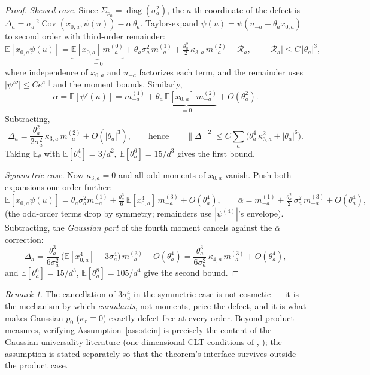 \documentclass[11pt]{article}
\theoremstyle{remark}
\newtheorem{remark}{Remark}
\newcommand{\E}{\mathbb{E}}
\newcommand{\Cov}{\operatorname{Cov}}
\newcommand{\diag}{\operatorname{diag}}
\newcommand{\Sig}{\Sigma_{p_0}}
\begin{document}
\begin{proof}
\emph{Skewed case.} Since $\Sig = \diag(\sigma_a^2)$, the $a$-th coordinate of the defect is $\Delta_a = \sigma_a^{-2}\Cov(x_{0,a}, \psi(u)) - \bar\alpha\,\theta_a$. Taylor-expand $\psi(u) = \psi(u_{-a} + \theta_a x_{0,a})$ to second order with third-order remainder:
\[
\E[x_{0,a}\psi(u)]
= \underbrace{\E[x_{0,a}]\,m^{(0)}_{-a}}_{=0}
+ \theta_a \sigma_a^2\, m^{(1)}_{-a}
+ \tfrac{\theta_a^2}{2}\,\kappa_{3,a}\, m^{(2)}_{-a}
+ \mathcal R_a,
\qquad |\mathcal R_a| \le C\,|\theta_a|^3,
\]
where independence of $x_{0,a}$ and $u_{-a}$ factorizes each term, and the remainder uses $|\psi'''| \le Ce^{a|\cdot|}$ and the moment bounds. Similarly,
\[
\bar\alpha = \E[\psi'(u)] = m^{(1)}_{-a} + \underbrace{\theta_a\,\E[x_{0,a}]\,m^{(2)}_{-a}}_{=0} + O(\theta_a^2).
\]
Subtracting,
\[
\Delta_a = \frac{\theta_a^2}{2\sigma_a^2}\,\kappa_{3,a}\, m^{(2)}_{-a} + O(|\theta_a|^3),
\qquad\text{hence}\qquad
\lVert\Delta\rVert^2 \le C\sum_a \big(\theta_a^4\,\kappa_{3,a}^2 + |\theta_a|^6\big).
\]
Taking $\E_\theta$ with $\E[\theta_a^4] = 3/d^2$, $\E[\theta_a^6] = 15/d^3$ gives the first bound.

\emph{Symmetric case.} Now $\kappa_{3,a} = 0$ and all odd moments of $x_{0,a}$ vanish. Push both expansions one order further:
\[
\E[x_{0,a}\psi(u)] = \theta_a\sigma_a^2 m^{(1)}_{-a} + \tfrac{\theta_a^3}{6}\,\E[x_{0,a}^4]\, m^{(3)}_{-a} + O(\theta_a^4),
\qquad
\bar\alpha = m^{(1)}_{-a} + \tfrac{\theta_a^2}{2}\,\sigma_a^2\, m^{(3)}_{-a} + O(\theta_a^4),
\]
(the odd-order terms drop by symmetry; remainders use $|\psi^{(4)}|$'s envelope). Subtracting, the \emph{Gaussian part} of the fourth moment cancels against the $\bar\alpha$ correction:
\[
\Delta_a = \frac{\theta_a^3}{6\sigma_a^2}\,\big(\E[x_{0,a}^4] - 3\sigma_a^4\big)\, m^{(3)}_{-a} + O(\theta_a^4)
= \frac{\theta_a^3}{6\sigma_a^2}\,\kappa_{4,a}\, m^{(3)}_{-a} + O(\theta_a^4),
\]
and $\E[\theta_a^6] = 15/d^3$, $\E[\theta_a^8] = 105/d^4$ give the second bound.
\end{proof}

\begin{remark}
The cancellation of $3\sigma_a^4$ in the symmetric case is not cosmetic --- it is the mechanism by which \emph{cumulants}, not moments, price the defect, and it is what makes Gaussian $p_0$ ($\kappa_r \equiv 0$) exactly defect-free at every order. Beyond product measures, verifying Assumption~\ref{ass:stein} is precisely the content of the Gaussian-universality literature (one-dimensional CLT conditions of \cite{HuLu22}, \cite{MS22}); the assumption is stated separately so that the theorem's interface survives outside the product case.
\end{remark}
\end{document}
